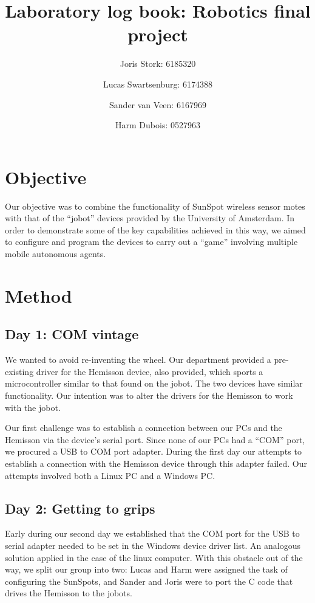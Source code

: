 \documentclass[a4paper, 12pt, titlepage]{article}
\author{Joris Stork: 6185320 \and Lucas Swartsenburg: 6174388 \and Sander van
Veen: 6167969 \and Harm Dubois: 0527963}
\title{Laboratory log book: Robotics final project}
\begin{document}
\maketitle

\section{Objective} %

Our objective was to combine the functionality of SunSpot wireless sensor
motes with that of the ``jobot'' devices provided by the University of
Amsterdam. In order to demonstrate some of the key capabilities achieved in this
way, we aimed to configure and program the devices to carry out a ``game''
involving multiple mobile autonomous agents.


\section{Method} %


\subsection{Day 1: COM vintage} %

We wanted to avoid re-inventing the wheel. Our department provided a
pre-existing driver for the Hemisson device, also provided, which sports a
microcontroller similar to that found on the jobot. The two devices have similar
functionality. Our intention was to alter the drivers for the Hemisson to work
with the jobot.

Our first challenge was to establish a connection between our PCs and the
Hemisson via the device's serial port. Since none of our PCs had a ``COM'' port,
we procured a USB to COM port adapter. During the first day our attempts to
establish a connection with the Hemisson device through this adapter failed. Our
attempts involved both a Linux PC and a Windows PC.


\subsection{Day 2: Getting to grips} %

Early during our second day we established that the COM port for the USB to
serial adapter needed to be set in the Windows device driver list. An analogous
solution applied in the case of the linux computer. With this obstacle out of
the way, we split our
group into two: Lucas and Harm were assigned the task of configuring the
SunSpots, and Sander and Joris were to port the C code that drives the Hemisson
to the jobots. 
\end{document}
